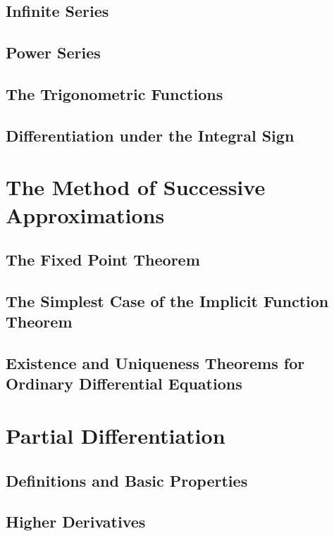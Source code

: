 \documentclass{article}
\begin{document}
		\subsection{Infinite Series}
		
		\subsection{Power Series}
		
		\subsection{The Trigonometric Functions}
		
		\subsection{Differentiation under the Integral Sign}
		
		
	\section{The Method of Successive Approximations}
		\subsection{The Fixed Point Theorem}
		
		\subsection{The Simplest Case of the Implicit Function Theorem}
		
		\subsection{Existence and Uniqueness Theorems for Ordinary Differential Equations}
	
	
	\section{Partial Differentiation}
		\subsection{Definitions and Basic Properties}
		
		\subsection{Higher Derivatives}
		
\end{document}
